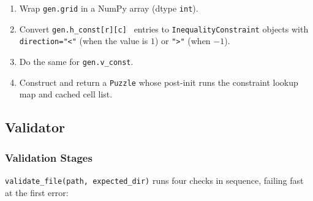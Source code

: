 \begin{enumerate}
  \item Wrap \texttt{gen.grid} in a NumPy array (dtype \texttt{int}).
  \item Convert \texttt{gen.h\_const[r][c] } entries to
        \texttt{InequalityConstraint} objects with \texttt{direction="<"}
        (when the value is $1$) or \texttt{">"} (when $-1$).
  \item Do the same for \texttt{gen.v\_const}.
  \item Construct and return a \texttt{Puzzle} whose post-init runs the
        constraint lookup map and cached cell list.
\end{enumerate}

\subsection{Validator}
\label{sec:validator}

\subsubsection{Validation Stages}

\texttt{validate\_file(path, expected\_dir)} runs four checks in sequence,
failing fast at the first error:

